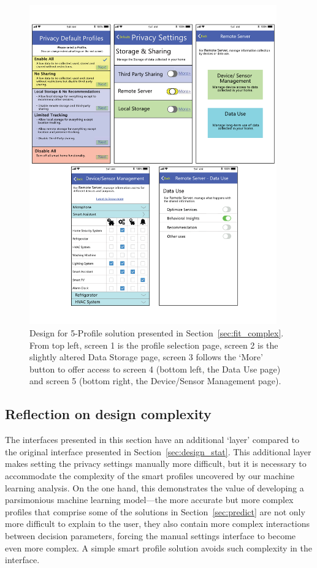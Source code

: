 \begin{figure}
	\centering
	\includegraphics[width=0.95\textwidth]{figures/cluster_complex.pdf}
	\caption{Design for 5-Profile solution presented in Section~\ref{sec:fit_complex}. From top left, screen 1 is the profile selection page, screen 2 is the slightly altered Data Storage page, screen 3 follows the `More' button to offer access to screen 4 (bottom left, the Data Use page) and screen 5 (bottom right, the Device/Sensor Management page).}
	\label{fig:cluster_complex}
\end{figure}

\subsection{Reflection on design complexity}
The interfaces presented in this section have an additional `layer' compared to the original interface presented in Section~\ref{sec:design_stat}. This additional layer makes setting the privacy settings manually more difficult, but it is necessary to accommodate the complexity of the smart profiles uncovered by our machine learning analysis. On the one hand, this demonstrates the value of developing a parsimonious machine learning model---the more accurate but more complex profiles that comprise some of the solutions in Section~\ref{sec:predict} are not only more difficult to explain to the user, they also contain more complex interactions between decision parameters, forcing the manual settings interface to become even more complex. A simple smart profile solution avoids such complexity in the interface. 

